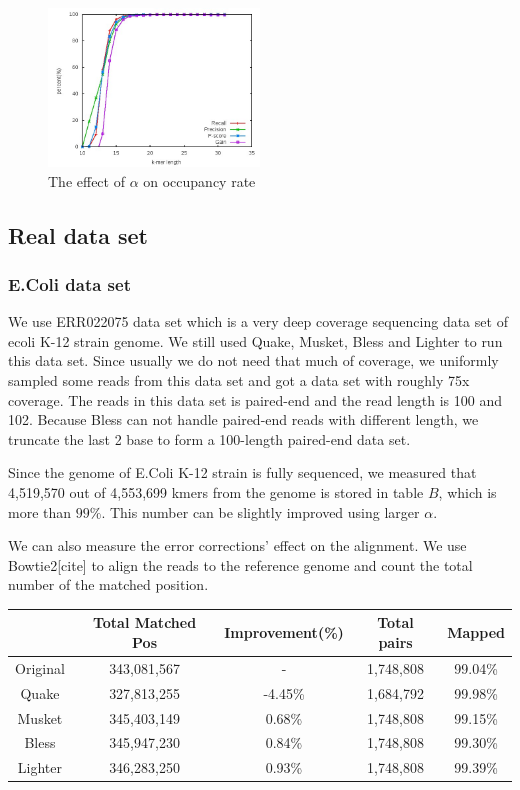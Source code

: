 \documentclass[10pt]{article}
\begin{document}
\begin{figure}[h!]
\begin{center}
\includegraphics[width=0.5\textwidth]{kmerLength.jpg}
\caption{The effect of $\alpha$ on occupancy rate\label{fig:kmerLength}}
\end{center}
\end{figure}


\subsection*{Real data set}
\subsubsection*{E.Coli data set}
We use ERR022075 data set which is a very deep coverage sequencing data set of ecoli K-12 strain genome. We still used Quake, Musket, Bless and Lighter to run this data set. Since usually we do not need that much of coverage, we uniformly sampled some reads from this data set and got a data set with roughly 75x coverage. The reads in this data set is paired-end and the read length is 100 and 102. Because Bless can not handle paired-end reads with different length, we truncate the last 2 base to form a 100-length paired-end data set.

Since the genome of E.Coli K-12 strain is fully sequenced, we measured that 4,519,570 out of 4,553,699 kmers from the genome is stored in table $B$, which is more than $99\%$. This number can be slightly improved using larger $\alpha$. 
 
We can also measure the error corrections' effect on the alignment. We use Bowtie2[cite] to align the reads to the reference genome and count the total number of the matched position.

\begin{tabular}{|c|c|c|c|c|}\hline
  & Total Matched Pos & Improvement(\%) & Total pairs & Mapped \\ \hline
Original	& 343,081,567	& - & 1,748,808	& 99.04\% \\ \hline
Quake	& 327,813,255	& -4.45\%	& 1,684,792	& 99.98\% \\ \hline
Musket	& 345,403,149	& 0.68\%	& 1,748,808	& 99.15\% \\ \hline
Bless	& 345,947,230	& 0.84\%	& 1,748,808	& 99.30\% \\ \hline
Lighter	&  346,283,250 & 0.93\%	& 1,748,808	& 99.39\% \\ \hline
\end{tabular}
\end{document}
